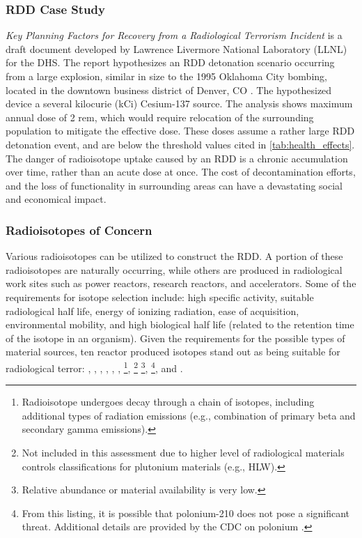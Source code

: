 \documentclass{report}
\begin{document}
 





\subsubsection{RDD Case Study}

\emph{Key Planning Factors for Recovery from a Radiological Terrorism Incident} is a draft document developed by Lawrence Livermore National Laboratory (LLNL) for the DHS. The report hypothesizes an RDD detonation scenario occurring from a large explosion, similar in size to the 1995 Oklahoma City bombing, located in the downtown business district of Denver, CO \cite{Security2012}.  The hypothesized device a several kilocurie (kCi) Cesium-137 source.  The analysis shows maximum  annual dose of 2 rem, which would require relocation of the surrounding population to mitigate the effective dose.  These doses   assume a rather large RDD detonation event, and are below the threshold values cited in \autoref{tab:health_effects}.  The danger of radioisotope uptake caused by an RDD is a chronic accumulation over time, rather than an acute dose at once.  The cost of decontamination efforts, and the loss of functionality in surrounding areas can have a devastating social and economical impact.  
 


\subsubsection{Radioisotopes of Concern}

Various radioisotopes can be utilized to construct the RDD.  A portion of these radioisotopes are naturally occurring, while others are produced in radiological work sites such as power reactors, research reactors, and accelerators.  Some of the requirements for isotope selection include: high specific activity, suitable radiological half life, energy of ionizing radiation, ease of acquisition, environmental mobility, and high biological half life (related to the retention time of the isotope in an organism).  Given the requirements for the possible types of material sources, ten reactor produced isotopes stand out as being suitable for radiological terror:  , , , , , ,  
\footnote{Radioisotope undergoes decay through a chain of isotopes, including additional types of radiation emissions (e.g., combination of primary beta and secondary gamma emissions).}, 
 \footnotemark[2] \footnote{Not included in this assessment due to higher level of radiological materials controls classifications for plutonium materials (e.g., HLW).} 
\footnote{Relative abundance or material availability is very low.}, 
 \footnotemark[2] \footnotemark[4] \footnote{From this listing, it is possible that polonium-210 does not pose a significant threat. Additional details are provided by the CDC on polonium \cite{CentersforDiseaseControlandPrevention2014}.}, 
and  \footnotemark[2] \footnotemark[4].
\end{document}
